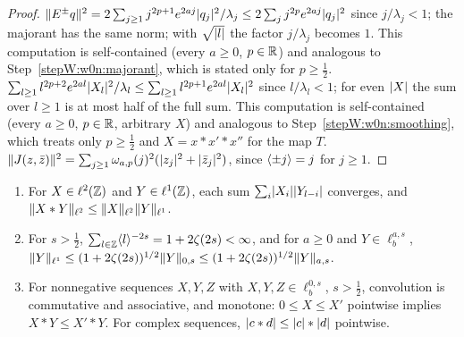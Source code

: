 \begin{proof}
\label{stepW:w1:ext}
$\lVert E^\pm q\rVert^2=2\sum_{j\ge1}j^{2p+1}e^{2aj}\lvert q_j\rvert^2/\lambda_j\le2\sum_jj^{2p}e^{2aj}\lvert q_j\rvert^2$ since
$j/\lambda_j<1$; the majorant has the same norm; with $\sqrt{\lvert l\rvert}$ the factor $j/\lambda_j$ becomes $1$. This
computation is self-contained (every $a\ge0$, $p\in\mathbb{R}$) and analogous to Step~\ref{stepW:w0n:majorant}, which is
stated only for $p\ge\frac12$.
\label{stepW:w1:restr}
$\sum_{l\ge1}l^{2p+2}e^{2al}\lvert X_l\rvert^2/\lambda_l\le\sum_{l\ge1}l^{2p+1}e^{2al}\lvert X_l\rvert^2$ since $l/\lambda_l<1$;
for even $\lvert X\rvert$ the sum over $l\ge1$ is at most half of the full sum. This computation is self-contained (every
$a\ge0$, $p\in\mathbb{R}$, arbitrary $X$) and analogous to Step~\ref{stepW:w0n:smoothing}, which treats only $p\ge\frac12$
and $X=x*x'*x''$ for the map $T$.
\label{stepW:w1:pair}
$\lVert J(z,\bar z)\rVert^2=\sum_{j\ge1}\omega_{a,p}(j)^2(\lvert z_j\rvert^2+\lvert \bar z_j\rvert^2)$, since $\langle \pm j\rangle=j$ for $j\ge1$.
\end{proof}

\begin{lemma}\label{bpW:w1:young}
\begin{enumerate}[label=(\roman*)]
\item For $X\in\ell^2(\mathbb{Z})$ and $Y\in\ell^1(\mathbb{Z})$, each sum $\sum_i\lvert X_i\rvert\lvert Y_{l-i}\rvert$ converges, and
  $\lVert X*Y\rVert_{\ell^2}\le\lVert X\rVert_{\ell^2}\lVert Y\rVert_{\ell^1}$.
\item For $s>\frac12$, $\sum_{l\in\mathbb{Z}}\langle l\rangle^{-2s}=1+2\zeta(2s)<\infty$, and for $a\ge0$ and $Y\in\ell^{a,s}_b$,
  $\lVert Y\rVert_{\ell^1}\le(1+2\zeta(2s))^{1/2}\lVert Y\rVert_{0,s}\le(1+2\zeta(2s))^{1/2}\lVert Y\rVert_{a,s}$.
\item For nonnegative sequences $X,Y,Z$ with $X,Y,Z\in\ell^{0,s}_b$, $s>\frac12$, convolution is commutative and
  associative, and monotone: $0\le X\le X'$ pointwise implies $X*Y\le X'*Y$. For complex sequences,
  $\lvert c*d\rvert\le\lvert c\rvert*\lvert d\rvert$ pointwise.
\end{enumerate}
\end{lemma}

